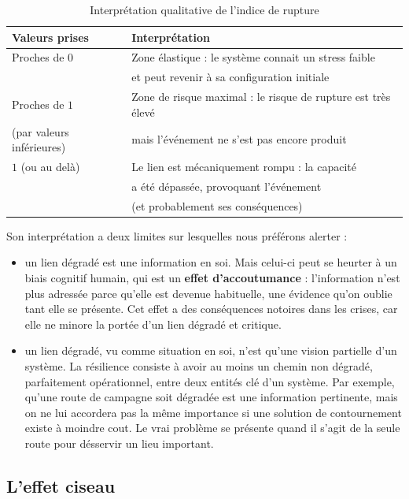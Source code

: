 \documentclass{report}
\begin{document}
	\begin{table}[H]
		\centering
		\begin{tabular}{|l|l|}
			\hline 
			\textbf{Valeurs prises} & \textbf{Interprétation} \\
			\hline 
			Proches de $0$ & Zone élastique : le système connait un stress faible \\
			& et peut revenir à sa configuration initiale \\
			\hline 
			Proches de $1$ & Zone de risque maximal : le risque de rupture est très élevé \\
			(par valeurs inférieures) & mais l'événement ne s'est pas encore produit \\
			\hline 
			$1$ (ou au delà) & Le lien est mécaniquement rompu : la capacité \\
			& a été dépassée, provoquant l'événement \\
			&  (et probablement ses conséquences) \\
			\hline 
		\end{tabular}
		\caption{Interprétation qualitative de l'indice de rupture}
	\end{table}
	
	
	Son interprétation a deux limites sur lesquelles nous préférons alerter : 
	\begin{itemize}
		\item un lien dégradé est une information en soi. Mais celui-ci peut se heurter à un biais cognitif humain, qui est un \textbf{effet d'accoutumance} : l'information n'est plus adressée parce qu'elle est devenue habituelle, une évidence qu'on oublie tant elle se présente. Cet effet a des conséquences notoires dans les crises, car elle ne minore la portée d'un lien dégradé et critique. 
		\item un lien dégradé, vu comme situation en soi, n'est qu'une vision partielle d'un système. La résilience consiste à avoir au moins un chemin non dégradé, parfaitement opérationnel, entre deux entités clé d'un système. Par exemple, qu'une route de campagne soit dégradée est une information pertinente, mais on ne lui accordera pas la même importance si une solution de contournement existe à moindre cout. Le vrai problème se présente quand il s'agit de la seule route pour désservir un lieu important. 
	\end{itemize}
	
	
	\subsection*{L'effet ciseau}
	
\end{document}
